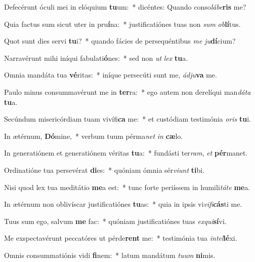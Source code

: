 \item Defecérunt óculi mei in elóquium \textbf{tu}um:~* dicéntes: Quando conso\textit{lá}\textit{be}\textbf{ris} me?
\item Quia factus sum sicut uter in pru\textbf{í}na:~* justificatiónes tuas non \textit{sum} \textit{ob}\textbf{lí}tus.
\item Quot sunt dies servi \textbf{tu}i?~* quando fácies de persequéntibus \textit{me} \textit{ju}\textbf{dí}cium?
\item Narravérunt mihi iníqui fabulati\textbf{ó}nes:~* sed non \textit{ut} \textit{lex} \textbf{tu}a.
\item Omnia mandáta tua \textbf{vé}ritas:~* iníque persecúti sunt me, \textit{ád}\textit{ju}\textbf{va} me.
\item Paulo minus consummavérunt me in \textbf{ter}ra:~* ego autem non derelíqui man\textit{dá}\textit{ta} \textbf{tu}a.
\item Secúndum misericórdiam tuam vivífi\textbf{ca} me:~* et custódiam testimónia \textit{o}\textit{ris} \textbf{tu}i.
\item In ætérnum, \textbf{Dó}mine,~* verbum tuum pérma\textit{net} \textit{in} \textbf{cæ}lo.
\item In generatiónem et generatiónem véritas \textbf{tu}a:~* fundásti ter\textit{ram}, \textit{et} \textbf{pér}manet.
\item Ordinatióne tua persevérat \textbf{di}es:~* quóniam ómnia sér\textit{vi}\textit{unt} \textbf{ti}bi.
\item Nisi quod lex tua meditátio \textbf{me}a est:~* tunc forte periíssem in humili\textit{tá}\textit{te} \textbf{me}a.
\item In ætérnum non oblivíscar justificatiónes \textbf{tu}as:~* quia in ipsis vi\textit{vi}\textit{fi}\textbf{cás}ti me.
\item Tuus sum ego, salvum \textbf{me} fac:~* quóniam justificatiónes tuas \textit{ex}\textit{qui}\textbf{sí}vi.
\item Me exspectavérunt peccatóres ut pérde\textbf{rent} me:~* testimónia tua \textit{in}\textit{tel}\textbf{lé}xi.
\item Omnis consummatiónis vidi \textbf{fi}nem:~* latum mandátum \textit{tu}\textit{um} \textbf{ni}mis.
